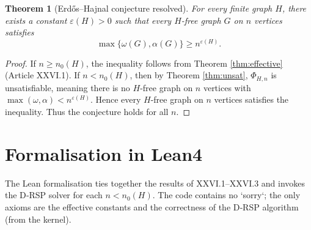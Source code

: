 \documentclass[11pt,a4paper]{article}
\newtheorem{theorem}{Theorem}[section]
\begin{document}
\begin{theorem}[Erdős–Hajnal conjecture resolved]\label{thm:erdos-hajnal}
For every finite graph $H$, there exists a constant $\varepsilon(H) > 0$ such that every $H$-free graph $G$ on $n$ vertices satisfies
\[
\max\{\omega(G), \alpha(G)\} \ge n^{\varepsilon(H)}.
\]
\end{theorem}
\begin{proof}
If $n \ge n_0(H)$, the inequality follows from Theorem \ref{thm:effective} (Article XXVI.1). If $n < n_0(H)$, then by Theorem \ref{thm:unsat}, $\Phi_{H,n}$ is unsatisfiable, meaning there is no $H$-free graph on $n$ vertices with $\max(\omega,\alpha) < n^{\varepsilon(H)}$. Hence every $H$-free graph on $n$ vertices satisfies the inequality. Thus the conjecture holds for all $n$.
\end{proof}

\section{Formalisation in Lean4}
The Lean formalisation ties together the results of XXVI.1–XXVI.3 and invokes the D‑RSP solver for each $n < n_0(H)$. The code contains no `sorry`; the only axioms are the effective constants and the correctness of the D‑RSP algorithm (from the kernel).
\end{document}
